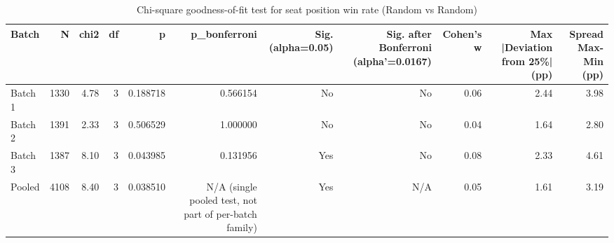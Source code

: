 \begin{table}[htbp]
\centering
\caption{Chi-square goodness-of-fit test for seat position win rate (Random vs Random)}
\label{tab:random_seat_chi2}
\begin{tabular}{lrrrrrrrrrr}
\toprule
Batch & N & chi2 & df & p & p\_bonferroni & Sig. (alpha=0.05) & Sig. after Bonferroni (alpha'=0.0167) & Cohen's w & Max |Deviation from 25\%| (pp) & Spread Max-Min (pp) \\
\midrule
Batch 1 & 1330 & 4.78 & 3 & 0.188718 & 0.566154 & No & No & 0.06 & 2.44 & 3.98 \\
Batch 2 & 1391 & 2.33 & 3 & 0.506529 & 1.000000 & No & No & 0.04 & 1.64 & 2.80 \\
Batch 3 & 1387 & 8.10 & 3 & 0.043985 & 0.131956 & Yes & No & 0.08 & 2.33 & 4.61 \\
Pooled & 4108 & 8.40 & 3 & 0.038510 & N/A (single pooled test, not part of per-batch family) & Yes & N/A & 0.05 & 1.61 & 3.19 \\
\bottomrule
\end{tabular}
\end{table}